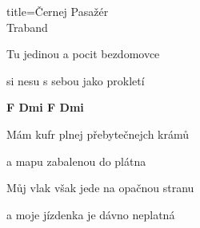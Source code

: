 \begin{song}{title=\centering Černej Pasažér \\\normalsize Traband \vspace*{-0.3cm}}
{\begin{minipage}[t]{0.48\textwidth}
Tu jedinou a pocit bezdomovce 

si nesu s sebou jako prokletí

\mezera
\textbf{F  Dmi F  Dmi }


\sloka
Mám kufr plnej přebytečnejch krámů 

a mapu zabalenou do plátna 

Můj vlak však jede na opačnou stranu 

a moje jízdenka je dávno neplatná


\end{minipage}   %
}
\end{song}
\setcounter{Slokočet}{0}

